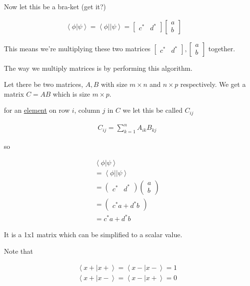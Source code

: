 \documentclass[
]{article}
\let\oldhyperref\hyperref
\renewcommand{\hyperref}[2][]{\oldhyperref[#1]{\underline{#2}}}
\providecommand{\ket}[1]{\left\lvert #1 \right\rangle}
\providecommand{\bra}[1]{\left\langle #1 \right\rvert}
\providecommand{\braket}[1]{\left\langle #1 \right\rangle}
\begin{document}
Now let this be a bra-ket (get it?)

\begin{gather*}
	\braket{\phi|\psi}=\bra{\phi}\ket{\psi}=\begin{bmatrix}c^* & d^*\end{bmatrix}\begin{bmatrix}a\\b\end{bmatrix}\quad
\end{gather*}

This means we're multiplying these two matrices
\(\begin{bmatrix}c^* & d^*\end{bmatrix},\begin{bmatrix}a\\b\end{bmatrix}\)
together.

The way we multiply matrices is by performing this algorithm.

Let there be two matrices, \(A,B\) with size \(m\times n\) and
\(n\times p\) respectively. We get a matrix \(C=AB\) which is size
\(m\times p\).

for an \hyperref[element]{element} on row \(i\), column \(j\) in \(C\) we let this be called
\(C_{ij}\)

\begin{gather*}
	C_{ij}=\sum_{k=1}^nA_{ik}B_{kj}
\end{gather*}

so

\begin{gather*}
	\braket{\phi|\psi}\\=\bra{\phi}\ket{\psi}\\=\begin{pmatrix}c^* & d^*\end{pmatrix}\begin{pmatrix}a\\b\end{pmatrix}\\=\begin{pmatrix}
		c^*a+d^*b\end{pmatrix}\\=c^*a+d^*b
\end{gather*}

It is a 1x1 matrix which can be simplified to a scalar value.

Note that

\begin{gather*}
	\braket{x+|x+}=\braket{x-|x-}=1\\
	\braket{x+|x-}=\braket{x-|x+}=0
\end{gather*}
\end{document}
